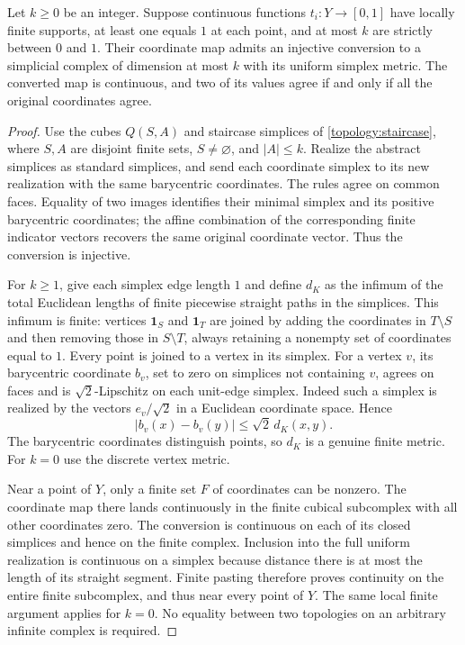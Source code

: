 \begin{lemma}
\label{cover:uniform}
Let $k\ge0$ be an integer.  Suppose continuous functions $t_i:Y\to[0,1]$ have locally finite
supports, at least one equals $1$ at each point, and at most $k$ are
strictly between $0$ and $1$.  Their coordinate map admits an injective
conversion to a simplicial complex of dimension at most $k$ with its
uniform simplex metric.  The converted map is continuous, and two of
its values agree if and only if all the original coordinates agree.
\end{lemma}
\begin{proof}
Use the cubes $Q(S,A)$ and staircase simplices of
\eqref{topology:staircase}, where $S,A$ are disjoint finite sets,
$S\ne\varnothing$, and $|A|\le k$.  Realize the abstract simplices
as standard simplices, and send each coordinate simplex to its new
realization with the same barycentric coordinates.  The rules agree
on common faces.  Equality of two images identifies their minimal
simplex and its positive barycentric coordinates; the affine
combination of the corresponding finite indicator vectors recovers
the same original coordinate vector.  Thus the conversion is injective.

For $k\ge1$, give each simplex edge length $1$ and define $d_K$
as the infimum of the total Euclidean lengths of finite piecewise
straight paths in the simplices.  This infimum is finite: vertices
$\mathbf1_S$ and $\mathbf1_T$ are joined by adding the coordinates
in $T\setminus S$ and then removing those in $S\setminus T$, always
retaining a nonempty set of coordinates equal to $1$.  Every point
is joined to a vertex in its simplex.  For a vertex $v$, its
barycentric coordinate $b_v$, set to zero on simplices not containing
$v$, agrees on faces and is $\sqrt2$-Lipschitz on each unit-edge
simplex.  Indeed such a simplex is realized by the vectors
$e_v/\sqrt2$ in a Euclidean coordinate space.  Hence
\[
 |b_v(x)-b_v(y)|\le\sqrt2\,d_K(x,y).
\]
The barycentric coordinates distinguish points, so $d_K$ is a genuine
finite metric.  For $k=0$ use the discrete vertex metric.

Near a point of $Y$, only a finite set $F$ of coordinates can be
nonzero.  The coordinate map there lands continuously in the finite
cubical subcomplex with all other coordinates zero.  The conversion
is continuous on each of its closed simplices and hence on the finite
complex.  Inclusion into the full uniform realization is continuous
on a simplex because distance there is at most the length of its
straight segment.  Finite pasting therefore proves continuity on
the entire finite subcomplex, and thus near every point of $Y$.
The same local finite argument applies for $k=0$.  No equality between two topologies on an arbitrary
infinite complex is required.
\end{proof}

